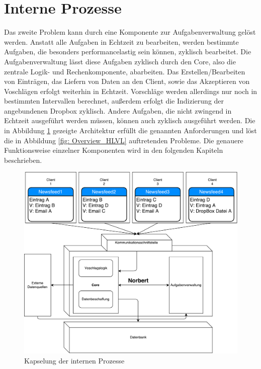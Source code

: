 \section{Interne Prozesse}

Das zweite Problem kann durch eine Komponente zur Aufgabenverwaltung gelöst werden. Anstatt alle Aufgaben in Echtzeit zu bearbeiten, werden bestimmte Aufgaben, die besonders performancelastig sein können, zyklisch bearbeitet. Die Aufgabenverwaltung lässt diese Aufgaben zyklisch durch den Core, also die zentrale Logik- und Rechenkomponente, abarbeiten. Das Erstellen/Bearbeiten von Einträgen, das Liefern von Daten an den Client, sowie das Akzeptieren von Voschlägen erfolgt weiterhin in Echtzeit. Vorschläge werden allerdings nur noch in bestimmten Intervallen berechnet, außerdem erfolgt die Indizierung der angebundenen Dropbox zyklisch. Andere Aufgaben, die nicht zwingend in Echtzeit ausgeführt werden müssen, können auch zyklisch ausgeführt werden. Die in Abbildung \ref{fig: Overview_Detail} gezeigte Architektur erfüllt die genannten Anforderungen und löst die in Abbildung \ref{fig: Overview_HLVL} auftretenden Probleme. Die genauere Funktionsweise einzelner Komponenten wird in den folgenden Kapiteln beschrieben.

\begin{figure}[H]
\centering
\includegraphics[scale=0.55]{uml-diagramms/overview_detail.pdf}
\caption{Kapselung der internen Prozesse}
\label{fig: Overview_Detail}
\end{figure}




        
